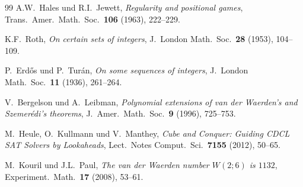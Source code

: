 \documentclass[12pt,a4paper]{amsart}
\theoremstyle{definition}
\begin{document}
\begin{thebibliography}{99}
A.W.\ Hales und R.I.\ Jewett,
\emph{Regularity and positional games},
Trans.\ Amer.\ Math.\ Soc.\ \textbf{106} (1963), 222--229.

K.F.\ Roth,
\emph{On certain sets of integers},
J.\ London Math.\ Soc.\ \textbf{28} (1953), 104--109.

P.\ Erd\H{o}s und P.\ Tur\'an,
\emph{On some sequences of integers},
J.\ London Math.\ Soc.\ \textbf{11} (1936), 261--264.

V.\ Bergelson und A.\ Leibman,
\emph{Polynomial extensions of van der Waerden's and Szemer\'edi's theorems},
J.\ Amer.\ Math.\ Soc.\ \textbf{9} (1996), 725--753.

M.\ Heule, O.\ Kullmann und V.\ Manthey,
\emph{Cube and Conquer: Guiding CDCL SAT Solvers by Lookaheads},
Lect.\ Notes Comput.\ Sci.\ \textbf{7155} (2012), 50--65.

M.\ Kouril und J.L.\ Paul,
\emph{The van der Waerden number $W(2;6)$ is $1132$},
Experiment.\ Math.\ \textbf{17} (2008), 53--61.

\end{thebibliography}
\end{document}
